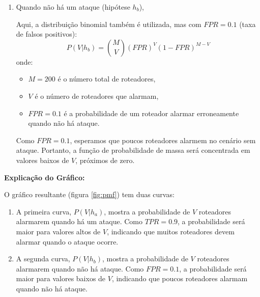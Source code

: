 \documentclass[12 pt]{article}
\begin{document}
\begin{enumerate}
\begin{tcolorbox}[colback=white, colframe=black, title=Resposta:]
\begin{enumerate}
            \item Quando não há um ataque (hipótese \( h_b \)),
            
            Aqui, a distribuição binomial também é utilizada, mas com \( FPR = 0.1 \) (taxa de falsos positivos):
           $$
           P(V | h_b) = \binom{M}{V} (FPR)^V (1 - FPR)^{M - V}
           $$
           onde:
            \begin{itemize}
                \item \( M = 200 \) é o número total de roteadores,
                \item \( V \) é o número de roteadores que alarmam,
                \item \( FPR = 0.1 \) é a probabilidade de um roteador alarmar erroneamente quando não há ataque.
            \end{itemize}
           Como \( FPR = 0.1 \), esperamos que poucos roteadores alarmem no cenário sem ataque. Portanto, a função de probabilidade de massa será concentrada em valores baixos de \( V \), próximos de zero.
        \end{enumerate}
        
        \end{tcolorbox}

        \begin{tcolorbox}[colback=white, colframe=black, title=Resposta (continuação):]
        
        \textbf{Explicação do Gráfico:}
        
        O gráfico resultante (figura \ref{fig:pmf}) tem duas curvas:
        \begin{enumerate}
            \item A primeira curva, \( P(V | h_a) \), mostra a probabilidade de \( V \) roteadores alarmarem quando há um ataque. Como \( TPR = 0.9 \), a probabilidade será maior para valores altos de \( V \), indicando que muitos roteadores devem alarmar quando o ataque ocorre.
            \item A segunda curva, \( P(V | h_b) \), mostra a probabilidade de \( V \) roteadores alarmarem quando não há ataque. Como \( FPR = 0.1 \), a probabilidade será maior para valores baixos de \( V \), indicando que poucos roteadores alarmam quando não há ataque.
        \end{enumerate}

    \end{tcolorbox}


\end{enumerate}
\end{document}
